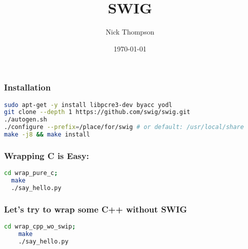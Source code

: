 \documentclass{beamer}
\begin{document}
\title{SWIG}
\author{Nick Thompson} 
\date{\today} 

\frame{\titlepage} 


\begin{frame}[fragile]
\frametitle{Installation}

\begin{lstlisting}[language=bash]
sudo apt-get -y install libpcre3-dev byacc yodl
git clone --depth 1 https://github.com/swig/swig.git
./autogen.sh
./configure --prefix=/place/for/swig # or default: /usr/local/share
make -j8 && make install
\end{lstlisting}
\end{frame}

\begin{frame}[fragile]
\frametitle{Wrapping C is Easy:}
\begin{lstlisting}[language=bash]
  cd wrap_pure_c;
  make
  ./say_hello.py
\end{lstlisting}
\end{frame}

\begin{frame}[fragile]
  \frametitle{Let's try to wrap some C++ without SWIG}
  \begin{lstlisting}[language=bash]
    cd wrap_cpp_wo_swip;
    make
    ./say_hello.py
  \end{lstlisting}
\end{frame}
\end{document}

